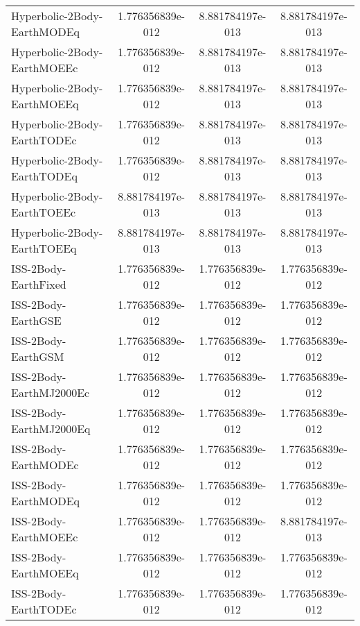 \begin{table}[htbp!]
\begin{tabular}{lccc}
         Hyperbolic-2Body-EarthMODEq & 1.776356839e-012 & 8.881784197e-013 & 8.881784197e-013 \\
         Hyperbolic-2Body-EarthMOEEc & 1.776356839e-012 & 8.881784197e-013 & 8.881784197e-013 \\
         Hyperbolic-2Body-EarthMOEEq & 1.776356839e-012 & 8.881784197e-013 & 8.881784197e-013 \\
         Hyperbolic-2Body-EarthTODEc & 1.776356839e-012 & 8.881784197e-013 & 8.881784197e-013 \\
         Hyperbolic-2Body-EarthTODEq & 1.776356839e-012 & 8.881784197e-013 & 8.881784197e-013 \\
         Hyperbolic-2Body-EarthTOEEc & 8.881784197e-013 & 8.881784197e-013 & 8.881784197e-013 \\
         Hyperbolic-2Body-EarthTOEEq & 8.881784197e-013 & 8.881784197e-013 & 8.881784197e-013 \\
         ISS-2Body-EarthFixed & 1.776356839e-012 & 1.776356839e-012 & 1.776356839e-012 \\
         ISS-2Body-EarthGSE & 1.776356839e-012 & 1.776356839e-012 & 1.776356839e-012 \\
         ISS-2Body-EarthGSM & 1.776356839e-012 & 1.776356839e-012 & 1.776356839e-012 \\
         ISS-2Body-EarthMJ2000Ec & 1.776356839e-012 & 1.776356839e-012 & 1.776356839e-012 \\
         ISS-2Body-EarthMJ2000Eq & 1.776356839e-012 & 1.776356839e-012 & 1.776356839e-012 \\
         ISS-2Body-EarthMODEc & 1.776356839e-012 & 1.776356839e-012 & 1.776356839e-012 \\
         ISS-2Body-EarthMODEq & 1.776356839e-012 & 1.776356839e-012 & 1.776356839e-012 \\
         ISS-2Body-EarthMOEEc & 1.776356839e-012 & 1.776356839e-012 & 8.881784197e-013 \\
         ISS-2Body-EarthMOEEq & 1.776356839e-012 & 1.776356839e-012 & 1.776356839e-012 \\
         ISS-2Body-EarthTODEc & 1.776356839e-012 & 1.776356839e-012 & 1.776356839e-012 \\

\end{tabular}
\end{table}
